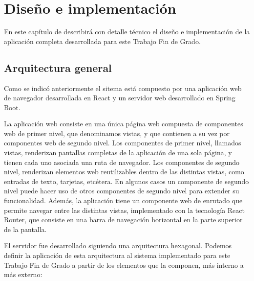 \documentclass[a4paper, 12pt]{book}
\begin{document}

    \cleardoublepage


    \chapter{Diseño e implementación}

    En este capítulo de describirá con detalle técnico el diseño e implementación de la aplicación completa desarrollada para este Trabajo Fin de Grado.


    \section{Arquitectura general}
    \label{sec:architecture_impl}

    Como se indicó anteriormente el sitema está compuesto por una aplicación web de navegador desarrollada en React y un servidor web desarrollado en Spring Boot.

    La aplicación web consiste en una única página web compuesta de componentes web de primer nivel, que denominamos vistas, y que contienen a su vez por componentes web de segundo nivel.
    Los componentes de primer nivel, llamados vistas, renderizan pantallas completas de la aplicación de una sola página, y tienen cada uno asociada una ruta de navegador.
    Los componentes de segundo nivel, renderizan elementos web reutilizables dentro de las distintas vistas, como entradas de texto, tarjetas, etcétera. En algunos casos un componente de segundo nivel puede hacer uso de otros componentes de segundo nivel para extender su funcionalidad.
    Además, la aplicación tiene un componente web de enrutado que permite navegar entre las distintas vistas, implementado con la tecnología React Router, que consiste en una barra de navegación horizontal en la parte superior de la pantalla.

    El servidor fue desarrollado siguiendo una arquitectura hexagonal.
    Podemos definir la aplicación de esta arquitectura al sistema implementado para este Trabajo Fin de Grado a partir de los elementos que la componen, más interno a más externo:
\end{document}
